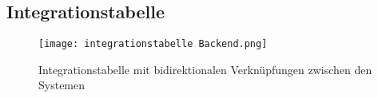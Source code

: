 \newpage
\subsection{Integrationstabelle}
\label{app:Integrationstabelle}
\begin{figure}[htb]
    \centering
    \texttt{[image: integrationstabelle Backend.png]}
    \caption{Integrationstabelle mit bidirektionalen Verknüpfungen zwischen den Systemen} 
    \label{fig:integrationstabelleBackend}
\end{figure}
